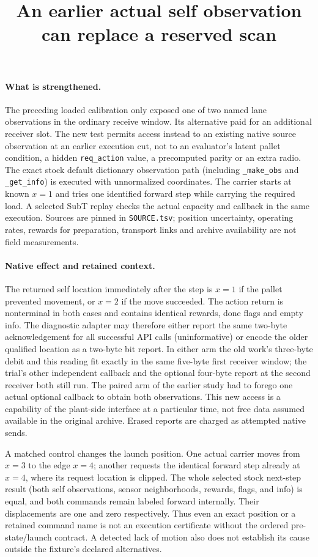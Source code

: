 \documentclass{article}
\title{An earlier actual self observation can replace a reserved scan}
\date{}
\begin{document}
\maketitle

\paragraph{What is strengthened.}
The preceding loaded calibration only exposed one of two named lane
observations in the ordinary receive window. Its alternative paid for
an additional receiver slot. The new test permits access instead to
an existing native source observation at an earlier execution cut,
not to an evaluator's latent pallet condition, a hidden
\verb|req_action| value, a precomputed parity or an extra radio.
The exact stock default dictionary observation path (including
\verb|_make_obs| and \verb|_get_info|) is executed with unnormalized
coordinates. The carrier starts at known $x=1$ and tries one
identified forward step while carrying the required load. A selected
SubT replay checks the actual capacity and callback in the same
execution. Sources are pinned in \verb|SOURCE.tsv|; position
uncertainty, operating rates, rewards for preparation, transport
links and archive availability are not field measurements.

\paragraph{Native effect and retained context.}
The returned self location immediately after the step is $x=1$
if the pallet prevented movement, or $x=2$ if the move succeeded.
The action return is nonterminal in both cases and contains
identical rewards, done flags and empty info. The diagnostic
adapter may therefore either report the same two-byte acknowledgement
for all successful API calls (uninformative) or encode the older
qualified location as a two-byte bit report. In either arm the
old work's three-byte debit and this reading fit exactly in the
same five-byte first receiver window; the trial's other independent
callback and the optional four-byte report at the second receiver
both still run. The paired arm of the earlier study had to
forego one actual optional callback to obtain both observations.
This new access is a capability of the plant-side interface at a
particular time, not free data assumed available in the original
archive. Erased reports are charged as attempted native sends.

A matched control changes the launch position. One actual carrier
moves from $x=3$ to the edge $x=4$; another requests the identical
forward step already at $x=4$, where its request location is clipped.
The whole selected stock next-step result (both self observations,
sensor neighborhoods, rewards, flags, and info) is equal, and
both commands remain labeled forward internally. Their displacements
are one and zero respectively. Thus even an exact position or a
retained command name is not an execution certificate without
the ordered pre-state/launch contract. A detected lack of motion
also does not establish its cause outside the fixture's declared
alternatives.
\end{document}
